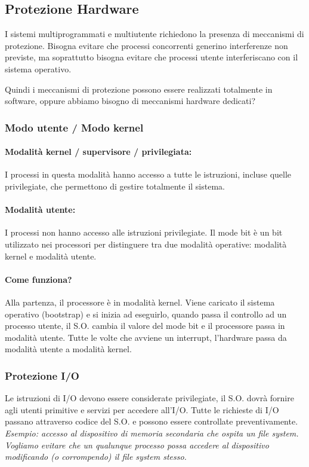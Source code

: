 \subsection{Protezione Hardware}
I sistemi multiprogrammati e multiutente richiedono la presenza di meccanismi di protezione. Bisogna evitare che processi concorrenti generino interferenze non
previste, ma soprattutto bisogna evitare che processi utente interferiscano con il sistema operativo.

Quindi i meccanismi di protezione possono essere realizzati totalmente in software, oppure abbiamo bisogno di meccanismi hardware dedicati?
\newpage
\subsubsection{Modo utente / Modo kernel}
\paragraph{Modalità kernel / supervisore / privilegiata:}
I processi in questa modalità hanno accesso a tutte le istruzioni, incluse quelle privilegiate, che permettono di gestire totalmente il sistema.
\paragraph{Modalità utente:} 
I processi non hanno accesso alle istruzioni privilegiate.
\newline
Il mode bit è un bit utilizzato nei processori per distinguere tra due modalità operative: modalità kernel e modalità utente.

\paragraph{Come funziona?}
Alla partenza, il processore è in modalità kernel.
Viene caricato il sistema operativo (bootstrap) e si inizia ad eseguirlo, quando passa il controllo ad un processo utente, il S.O. cambia il valore del mode bit e il processore passa in modalità utente.
Tutte le volte che avviene un interrupt, l'hardware passa da modalità utente a modalità kernel.

\subsubsection{Protezione I/O}
Le istruzioni di I/O devono essere considerate privilegiate, il S.O. dovrà fornire agli utenti primitive e servizi per accedere all'I/O. Tutte le richieste di I/O passano attraverso codice del S.O. e possono essere controllate preventivamente.
\textit{Esempio: accesso al dispositivo di memoria secondaria che ospita un file system. Vogliamo evitare che un qualunque processo possa accedere al dispositivo modificando (o corrompendo) il file system stesso.}

